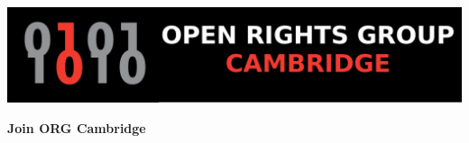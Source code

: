 \documentclass[10.5pt,a5paper]{article} %
\begin{document}

\begin{center}
	\vspace{1cm}
		\begin{minipage}{\textwidth}
			\begin{center}
			\color{white}
			\vspace{0.3cm}
	             \includegraphics[width=1\textwidth]{ORG.png} %
			\vspace{0.3cm}
			\end{center}
		\end{minipage}
\end{center}


\begin{center}
\vspace{0.5cm}
\textbf{{\huge Join ORG Cambridge} %
\vspace{0.5cm}
}\end{center}
\end{document}
